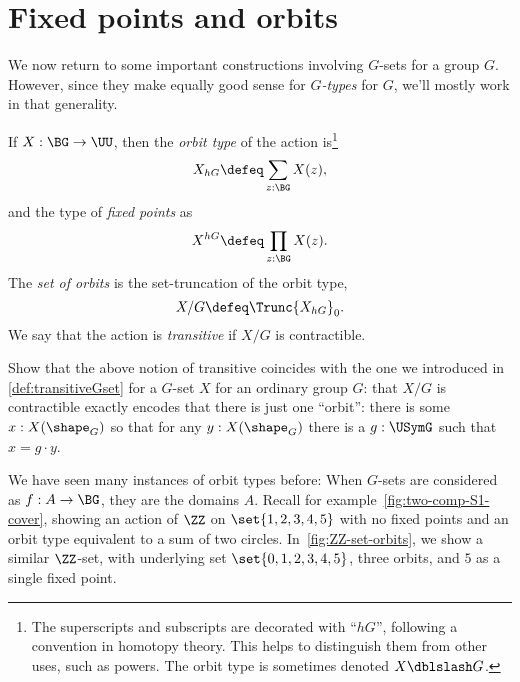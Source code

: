 \section{Fixed points and orbits}
\label{sec:fixpts-orbits}
We now return to some important constructions involving $G$-sets for a group $G$.
However, since they make equally good sense for \emph{$G$-types} for \aninftygp
$G$, we'll mostly work in that generality.
\begin{definition}
  \label{def:orbittype}
  If $X : \BG\to\UU$, then the \emph{orbit type}
  of the action is\footnote{%
    The superscripts and subscripts are decorated with ``$hG$'',
    following a convention in homotopy theory.
    This helps to distinguish them from other uses, such as powers.
    The orbit type is sometimes denoted $X \dblslash G$.}
\[
  X_{hG} \defeq \sum_{z:\BG} X(z),
\]
and the type of \emph{fixed points} as
\[
  X^{hG} \defeq \prod_{z:\BG} X(z).
\]
The \emph{set of orbits} is the set-truncation of the orbit type,
\[
  X / G \defeq \Trunc{X_{hG}}_0.
\]
We say that the action is \emph{transitive}
if $X / G$ is contractible.
\end{definition}

\begin{xca}
  Show that the above notion of transitive coincides with the one we introduced in \cref{def:transitiveGset} for a $G$-set $X$ for an ordinary group $G$:
  that $X/G$ is contractible exactly encodes that there is just one ``orbit'':
  there is some $x:X(\shape_G)$ so that for any $y:X(\shape_G)$
  there is a $g:\USymG$ such that $x=g\cdot y$.
\end{xca}

We have seen many instances of orbit types before:
When $G$-sets are considered as \coverings $f : A \to \BG$,
they are the domains $A$.
Recall for example~\cref{fig:two-comp-S1-cover},
showing an action of $\ZZ$ on $\set{1,2,3,4,5}$ with no fixed points
and an orbit type equivalent to a sum of two circles.
In~\cref{fig:ZZ-set-orbits}, we show a similar $\ZZ$-set,
with underlying set $\set{0,1,2,3,4,5}$, three orbits,
and $5$ as a single fixed point.

